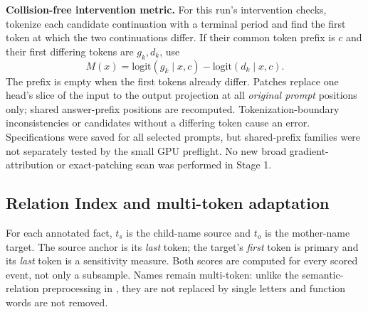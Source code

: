 \textbf{Collision-free intervention metric.} For this run's intervention checks, tokenize each candidate continuation with a terminal period and find the first token at which the two continuations differ. If their common token prefix is $c$ and their first differing tokens are $g_k,d_k$, use
\begin{equation}
M(x)=\mathrm{logit}(g_k\mid x,c)-\mathrm{logit}(d_k\mid x,c).
\end{equation}
The prefix is empty when the first tokens already differ. Patches replace one head's slice of the input to the output projection at all \emph{original prompt} positions only; shared answer-prefix positions are recomputed. Tokenization-boundary inconsistencies or candidates without a differing token cause an error. Specifications were saved for all selected prompts, but shared-prefix families were not separately tested by the small GPU preflight. No new broad gradient-attribution or exact-patching scan was performed in Stage 1.

\subsection{Relation Index and multi-token adaptation}
For each annotated fact, $t_s$ is the child-name source and $t_o$ is the mother-name target. The source anchor is its \emph{last} token; the target's \emph{first} token is primary and its \emph{last} token is a sensitivity measure. Both scores are computed for every scored event, not only a subsample. Names remain multi-token: unlike the semantic-relation preprocessing in \cite{ren}, they are not replaced by single letters and function words are not removed.

